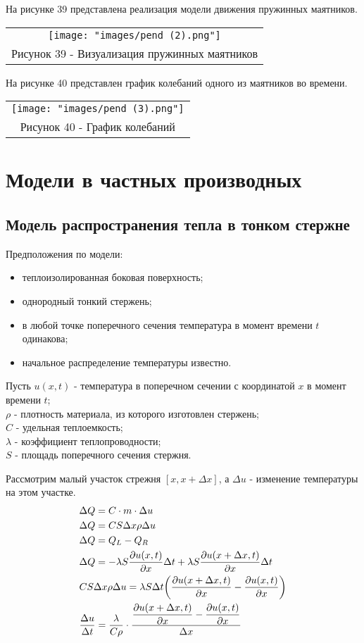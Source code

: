 На рисунке 39 представлена реализация модели движения пружинных маятников.
\begin{center}
  \begin{tabular}{c}
  \texttt{[image: "images/pend (2).png"]}\\
  Рисунок 39 - Визуализация пружинных маятников
\end{tabular}
\end{center}

На рисунке 40 представлен график колебаний одного из маятников во времени.
\begin{center}
  \begin{tabular}{c}
  \texttt{[image: "images/pend (3).png"]}\\
  Рисунок 40 - График колебаний
\end{tabular}
\end{center}

\section{Модели в частных производных}
\subsection{Модель распространения тепла в тонком стержне}
\noindent Предположения по модели:
\begin{itemize}
  \item теплоизолированная боковая поверхность;
  \item однородный тонкий стержень;
  \item в любой точке поперечного сечения температура в момент времени $t$ одинакова;
  \item начальное распределение температуры известно.
\end{itemize}
Пусть $u(x,t)$ - температура в поперечном сечении с координатой $x$ в момент времени $t$;\\
$\rho$ - плотность материала, из которого изготовлен стержень;\\
$C$ - удельная теплоемкость;\\
$\lambda$ - коэффициент теплопроводности;\\
$S$ - площадь поперечного сечения стержня.

Рассмотрим малый участок стрежня $[x,x+\Delta x]$, а $\Delta u$ - изменение температуры на этом участке.
\begin{align}
  &\Delta Q=C\cdot m \cdot \Delta u\notag\\
  &\Delta Q=CS\Delta x\rho\Delta u\notag\\
  &\Delta Q = Q_L-Q_R\notag\\
  &\Delta Q = -\lambda S\dfrac{\partial u(x,t)}{\partial x}\Delta t+\lambda S\dfrac{\partial u(x+\Delta x,t)}{\partial x}\Delta t\\
  &CS\Delta x\rho\Delta u=\lambda S\Delta t\bigg(\dfrac{\partial u(x+\Delta x,t)}{\partial x}-\dfrac{\partial u(x,t)}{\partial x} \bigg)\notag\\
  &\dfrac{\Delta u}{\Delta t}=\dfrac{\lambda}{C\rho}\cdot \dfrac{\dfrac{\partial u(x+\Delta x,t)}{\partial x}-\dfrac{\partial u(x,t)}{\partial x}}{\Delta x}\notag
\end{align}

